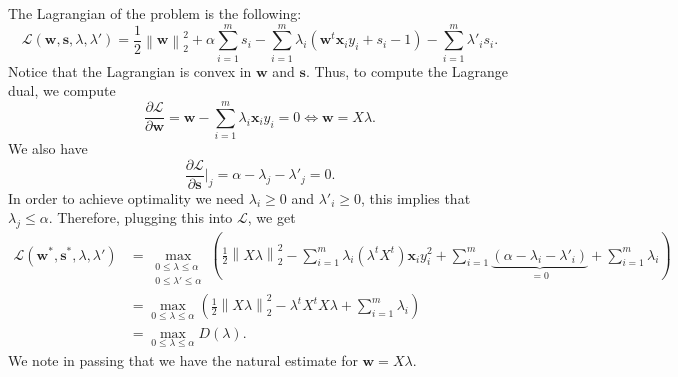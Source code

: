 \documentclass{article}
\begin{document}
\begin{itemize}
           The Lagrangian of the problem
           is the following:
           \begin{equation*}
               \mathcal{L}\left(\mathbf{w},\mathbf{s},\lambda, \lambda'\right) =
               \frac{1}{2}\left\|\mathbf{w}\right\|_{2}^{2}
               +\alpha \sum_{i = 1}^{m}s_{i}
               - \sum_{i =1}^{m}\lambda_{i}
               \left(\mathbf{w}^{t}\mathbf{x}_{i}y_{i} + s_{i} - 1\right)
               - \sum_{i = 1}^{m}\lambda'_{i} s_{i}.
           \end{equation*}
           Notice that the Lagrangian is convex in $\mathbf{w}$ 
           and $\mathbf{s}$.
           Thus, to compute the Lagrange dual, we compute
           \begin{equation*}
               \frac{\partial \mathcal{L}}{\partial \mathbf{w}} =
               \mathbf{w} - \sum_{i = 1}^{m}\lambda_{i}\mathbf{x}_{i}y_{i} = 0
               \Longleftrightarrow
               \mathbf{w} = X \lambda.
           \end{equation*}
           We also have
           \begin{equation*}
               \frac{\partial \mathcal{L}}{\partial \mathbf{s}}\Big|_{j}
               = \alpha - \lambda_{j} - \lambda'_{j} =0.
           \end{equation*}
           In order to achieve optimality we 
           need $\lambda_{i} \geq 0$ and
           $\lambda'_{i} \geq 0$,
           this implies that $\lambda_{j} \leq \alpha$.
           Therefore, plugging this into $\mathcal{L}$,
           we get
           \begin{align*}
               \mathcal{L}\left(\mathbf{w}^{*},
               \mathbf{s}^{*}, \lambda, \lambda'\right) &=
               \max_{\substack{0 \leq \lambda \leq \alpha \\ 0 \leq \lambda' \leq \alpha}}
               \left(
               \frac{1}{2}\left\|X \lambda\right\|_{2}^{2}
               - \sum_{i = 1}^{m} \lambda_{i}\left(\lambda^{t}X^{t}\right)\mathbf{x}_{i}y_{i}^{2}
               + \sum_{i = 1}^{m} \underbrace{\left(\alpha - \lambda_{i} - \lambda'_{i}\right)}_{=0}
               + \sum_{i = 1}^{m}\lambda_{i}
               \right) \\
               &= \max_{0 \leq \lambda \leq \alpha} \left(
               \frac{1}{2}\left\|X \lambda\right\|_{2}^{2} - 
               \lambda^{t} X^{t} X \lambda
               + \sum_{i = 1}^{m}\lambda_{i}
               \right) \\
               &= \max_{0 \leq \lambda \leq \alpha} D\left(\lambda\right).
           \end{align*}
           We note in passing that we have
           the natural estimate for $\mathbf{w} = X \lambda$.




\end{itemize}
\end{document}
